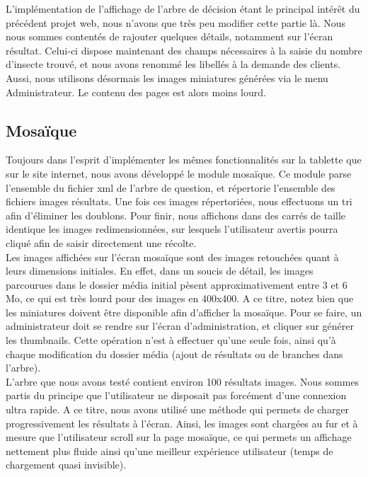 \documentclass[twoside]{EPURapport}
\begin{document}
		L'implémentation de l'affichage de l'arbre de décision étant le principal intérêt du précédent projet web, nous n'avons que très peu modifier cette partie là. Nous nous sommes contentés de rajouter quelques détails, notamment sur l'écran résultat. Celui-ci dispose maintenant des champs nécessaires à la saisie du nombre d'insecte trouvé, et nous avons renommé les libellés à la demande des clients. Aussi, nous utilisons désormais les images miniatures générées via le menu Administrateur. Le contenu des pages est alors moins lourd.
		
		\subsection{Mosaïque}

	Toujours dans l'esprit d'implémenter les mêmes fonctionnalités sur la tablette que sur le site internet, nous avons développé le module mosaïque. Ce module parse l'ensemble du fichier xml de l'arbre de question, et répertorie l'ensemble des fichiers images résultats. Une fois ces images répertoriées, nous effectuons un tri afin d'éliminer les doublons. Pour finir, nous affichons dans des carrés de taille identique les images redimensionnées, sur lesquels l'utilisateur avertis pourra cliqué afin de saisir directement une récolte.\\
	
	Les images affichées sur l'écran mosaïque sont des images retouchées quant à leurs dimensions initiales. En effet, dans un soucis de détail, les images parcourues dans le dossier média initial pèsent approximativement entre 3 et 6 Mo, ce qui est très lourd pour des images en 400x400. A ce titre, notez bien que les miniatures doivent être disponible afin d'afficher la mosaïque. Pour se faire, un administrateur doit se rendre sur l'écran d'administration, et cliquer sur générer les thumbnails. Cette opération n'est à effectuer qu'une seule fois, ainsi qu'à chaque modification du dossier média (ajout de résultats ou de branches dans l'arbre).\\
	
	L'arbre que nous avons testé contient environ 100 résultats images. Nous sommes partis du principe que l'utilisateur ne disposait pas forcément d'une connexion ultra rapide. A ce titre, nous avons utilisé une méthode qui permets de charger progressivement les résultats à l'écran. Ainsi, les images sont chargées au fur et à mesure que l'utilisateur scroll sur la page mosaïque, ce qui permets un affichage nettement plus fluide ainsi qu'une meilleur expérience utilisateur (temps de chargement quasi invisible).
\end{document}

